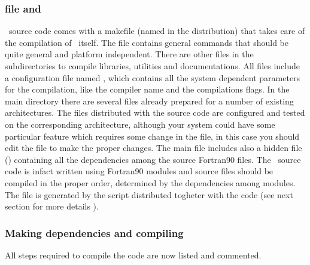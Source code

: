 \subsubsection{ file and }

\PDAC\ source code comes with a makefile (named  in the distribution)
that takes care of the compilation of \PDAC\ itself.
The  file contains general commands that should be quite general
and platform independent. There are other  files in the 
subdirectories to compile libraries, utilities and documentations.
All  files include a configuration file named ,
which contains all the system dependent parameters for the compilation,
like the compiler name and the compilations flags.
In the main directory there are several  files already prepared
for a number of existing architectures. 
The  files distributed with the source code
are configured and tested on the corresponding architecture, although your system
could have some particular feature which requires some change in the 
 file, in this case you should edit the file to make the
proper changes. 
The main  file includes also a hidden file () 
containing all the dependencies among the source Fortran90 files. The \PDAC\ 
source code is infact written using Fortran90 modules and source files
should be compiled in the proper order, determined by the dependencies
among modules. The file \FIL{.dependencies} is generated by the  script
distributed togheter with the code (see next section for more details ).

\subsubsection{Making dependencies and compiling}

All steps required to compile the code are now listed and commented.

